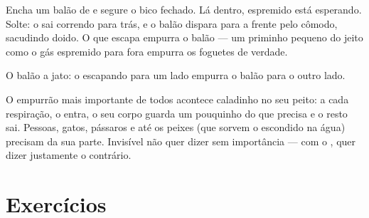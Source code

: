 \begin{example}\label{ex:g2:air-around-us:balloon}
Encha um balão de  e segure o bico fechado. Lá dentro, 
espremido está esperando. Solte: o  sai correndo para trás, e o
balão dispara para a frente pelo cômodo, sacudindo doido. O  que
escapa empurra o balão --- um priminho pequeno do jeito como o gás
espremido para fora empurra os foguetes de verdade.
\end{example}

\begin{omfigure}

{\small O balão a jato: o  escapando para um lado empurra o balão
para o outro lado.}
\end{omfigure}

\begin{remark}[O ar é precioso]\label{rem:g2:air-around-us:breathe}
O empurrão mais importante de todos acontece caladinho no seu peito:
a cada respiração, o  entra, o seu corpo guarda um pouquinho do que
precisa e o resto sai. Pessoas, gatos, pássaros e até os peixes (que
sorvem o  escondido na água) precisam da sua parte. Invisível não
quer dizer sem importância --- com o , quer dizer justamente o
contrário.
\end{remark}

\section{Exercícios}

